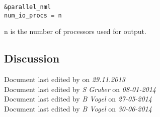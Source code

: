 \begin{verbatim}
&parallel_nml
num_io_procs = n
\end{verbatim}

n is the number of processors used for output.

\newpage
\subsection*{Discussion}
Document last edited by \textit{\krauti} on \textit{29.11.2013}\\
Document last edited by \textit{S Gruber} on \textit{08-01-2014}\\
Document last edited by \textit{B Vogel} on \textit{27-05-2014}\\
Document last edited by \textit{B Vogel} on \textit{30-06-2014}\\




